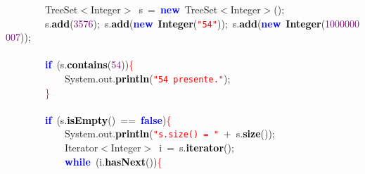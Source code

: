 {{\mbox{}\ \ \ \ \ \ \ \ TreeSet\textcolor{BrickRed}{$<$}Integer\textcolor{BrickRed}{$>$}\ s\ \textcolor{BrickRed}{=}\ \textbf{\textcolor{Blue}{new}}\ TreeSet\textcolor{BrickRed}{$<$}Integer\textcolor{BrickRed}{$>$();} \\
\mbox{}\ \ \ \ \ \ \ \ s\textcolor{BrickRed}{.}\textbf{\textcolor{Black}{add}}\textcolor{BrickRed}{(}\textcolor{Purple}{3576}\textcolor{BrickRed}{);}\ s\textcolor{BrickRed}{.}\textbf{\textcolor{Black}{add}}\textcolor{BrickRed}{(}\textbf{\textcolor{Blue}{new}}\ \textbf{\textcolor{Black}{Integer}}\textcolor{BrickRed}{(}\texttt{\textcolor{Red}{"{}54"{}}}\textcolor{BrickRed}{));}\ s\textcolor{BrickRed}{.}\textbf{\textcolor{Black}{add}}\textcolor{BrickRed}{(}\textbf{\textcolor{Blue}{new}}\ \textbf{\textcolor{Black}{Integer}}\textcolor{BrickRed}{(}\textcolor{Purple}{1000000007}\textcolor{BrickRed}{));} \\
\mbox{}\ \ \ \ \ \ \ \ \ \ \ \ \ \ \ \ \  \\
\mbox{}\ \ \ \ \ \ \ \ \textbf{\textcolor{Blue}{if}}\ \textcolor{BrickRed}{(}s\textcolor{BrickRed}{.}\textbf{\textcolor{Black}{contains}}\textcolor{BrickRed}{(}\textcolor{Purple}{54}\textcolor{BrickRed}{))}\textcolor{Red}{\{} \\
\mbox{}\ \ \ \ \ \ \ \ \ \ \ \ System\textcolor{BrickRed}{.}out\textcolor{BrickRed}{.}\textbf{\textcolor{Black}{println}}\textcolor{BrickRed}{(}\texttt{\textcolor{Red}{"{}54\ presente."{}}}\textcolor{BrickRed}{);} \\
\mbox{}\ \ \ \ \ \ \ \ \textcolor{Red}{\}} \\
\mbox{}\ \ \ \ \ \ \ \ \ \ \ \ \ \ \ \ \  \\
\mbox{}\ \ \ \ \ \ \ \ \textbf{\textcolor{Blue}{if}}\ \textcolor{BrickRed}{(}s\textcolor{BrickRed}{.}\textbf{\textcolor{Black}{isEmpty}}\textcolor{BrickRed}{()}\ \textcolor{BrickRed}{==}\ \textbf{\textcolor{Blue}{false}}\textcolor{BrickRed}{)}\textcolor{Red}{\{} \\
\mbox{}\ \ \ \ \ \ \ \ \ \ \ \ System\textcolor{BrickRed}{.}out\textcolor{BrickRed}{.}\textbf{\textcolor{Black}{println}}\textcolor{BrickRed}{(}\texttt{\textcolor{Red}{"{}s.size()\ =\ "{}}}\ \textcolor{BrickRed}{+}\ s\textcolor{BrickRed}{.}\textbf{\textcolor{Black}{size}}\textcolor{BrickRed}{());} \\
\mbox{}\ \ \ \ \ \ \ \ \ \ \ \ Iterator\textcolor{BrickRed}{$<$}Integer\textcolor{BrickRed}{$>$}\ i\ \textcolor{BrickRed}{=}\ s\textcolor{BrickRed}{.}\textbf{\textcolor{Black}{iterator}}\textcolor{BrickRed}{();} \\
\mbox{}\ \ \ \ \ \ \ \ \ \ \ \ \textbf{\textcolor{Blue}{while}}\ \textcolor{BrickRed}{(}i\textcolor{BrickRed}{.}\textbf{\textcolor{Black}{hasNext}}\textcolor{BrickRed}{())}\textcolor{Red}{\{} \\
}}
